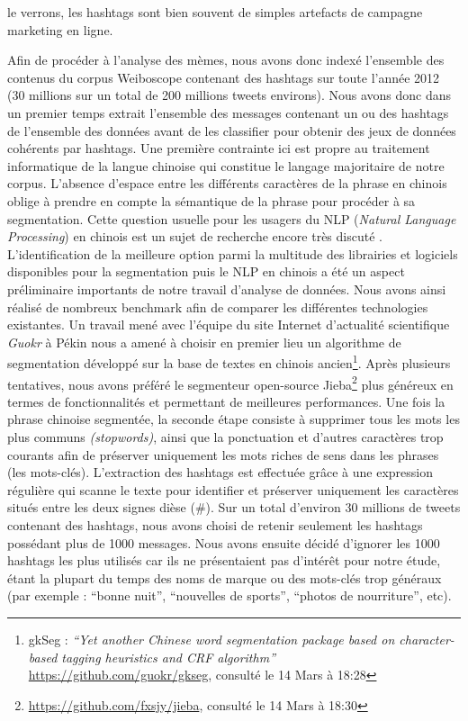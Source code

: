 le verrons, les hashtags sont bien souvent de simples artefacts de campagne marketing en ligne.

Afin de procéder à l{\textquoteright}analyse des mèmes, nous avons donc indexé l{\textquoteright}ensemble des contenus du corpus Weiboscope contenant des hashtags sur toute l{\textquoteright}année 2012 (30 millions sur un total de 200 millions tweets environs). Nous avons donc dans un premier temps extrait l{\textquoteright}ensemble des messages contenant un ou des hashtags de l{\textquoteright}ensemble des données avant de les classifier pour obtenir des jeux de données cohérents par hashtags. Une première contrainte ici est propre au traitement informatique de la langue chinoise qui constitue le langage majoritaire de notre corpus. L{\textquoteright}absence d{\textquoteright}espace entre les différents caractères de la phrase en chinois oblige à prendre en compte la sémantique de la phrase pour procéder à sa segmentation. Cette question usuelle pour les usagers du NLP (\textit{Natural Language Processing}) en chinois est un sujet de recherche encore très discuté \citep{Qiu2013}. L{\textquoteright}identification de la meilleure option parmi la multitude des librairies et logiciels disponibles pour la segmentation puis le NLP en chinois a été un aspect préliminaire importants de notre travail d{\textquoteright}analyse de données. Nous avons ainsi réalisé de nombreux benchmark afin de comparer les différentes technologies existantes. Un travail mené avec l{\textquoteright}équipe du site Internet d{\textquoteright}actualité scientifique \textit{Guokr }à Pékin nous a amené à choisir en premier lieu un algorithme de segmentation développé sur la base de textes en chinois ancien\footnote{ gkSeg : \textit{{\textquotedblleft}Yet another Chinese word segmentation package based on character-based tagging heuristics and CRF algorithm{\textquotedblright} }\url{https://github.com/guokr/gkseg}, consulté le 14 Mars à 18:28}. Après plusieurs tentatives, nous avons préféré le segmenteur open-source Jieba\footnote{ \url{https://github.com/fxsjy/jieba}, consulté le 14 Mars à 18:30} plus généreux en termes de fonctionnalités et permettant de meilleures performances. Une fois la phrase chinoise segmentée, la seconde étape consiste à supprimer tous les mots les plus communs \textit{(stopwords)}, ainsi que la ponctuation et d{\textquoteright}autres caractères trop courants afin de préserver uniquement les mots riches de sens dans les phrases (les mots-clés). L{\textquoteright}extraction des hashtags est effectuée gr\^ace à une expression régulière qui scanne le texte pour identifier et préserver uniquement les caractères situés entre les deux signes dièse (\#). Sur un total d{\textquoteright}environ 30 millions de tweets contenant des hashtags, nous avons choisi de retenir seulement les hashtags possédant plus de 1000 messages. Nous avons ensuite décidé d{\textquoteright}ignorer les 1000 hashtags les plus utilisés car ils ne présentaient pas d{\textquoteright}intér\^et pour notre étude, étant la plupart du temps des noms de marque ou des mots-clés trop généraux (par exemple : {\textquotedblleft}bonne nuit{\textquotedblright}, {\textquotedblleft}nouvelles de sports{\textquotedblright}, {\textquotedblleft}photos de nourriture{\textquotedblright}, etc).

